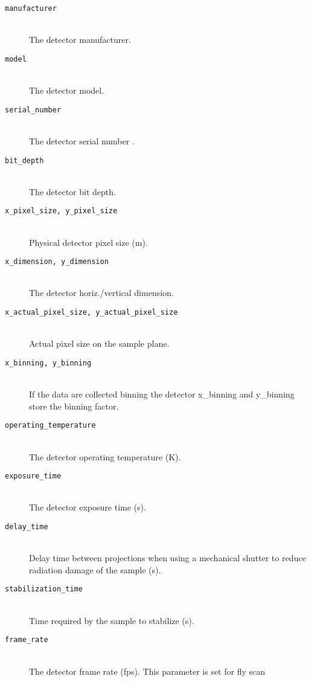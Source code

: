 \begin{description}
\item[\tt{manufacturer}] \hfill \\
{The detector manufacturer.}

\item[\tt{model}] \hfill \\
{The detector model.}

\item[\tt{serial\_number}] \hfill \\
{The detector serial number .}
     
\item[\tt{bit\_depth}] \hfill \\
{The detector bit depth.}

\item[\tt{x\_pixel\_size, y\_pixel\_size}] \hfill \\
{Physical detector pixel size (m).}

\item[\tt{x\_dimension, y\_dimension}] \hfill \\
{The detector horiz./vertical dimension.}

\item[\tt{x\_actual\_pixel\_size, y\_actual\_pixel\_size}] \hfill \\
{Actual pixel size on the sample plane.}


\item[\tt{x\_binning, y\_binning}] \hfill \\
{If the data are collected binning the detector x\_binning and y\_binning store the binning factor.}

\item[\tt{operating\_temperature}] \hfill \\
{The detector operating temperature (K).}

\item[\tt{exposure\_time}] \hfill \\
{The detector exposure time (s).}

\item[\tt{delay\_time}] \hfill \\
{Delay time between projections when using a mechanical shutter to reduce radiation damage of the sample (s).}

\item[\tt{stabilization\_time}] \hfill \\
{Time required by the sample to stabilize (s).}

\item[\tt{frame\_rate}] \hfill \\
{The detector frame rate (fps). This parameter is set for fly scan}


\end{description}
